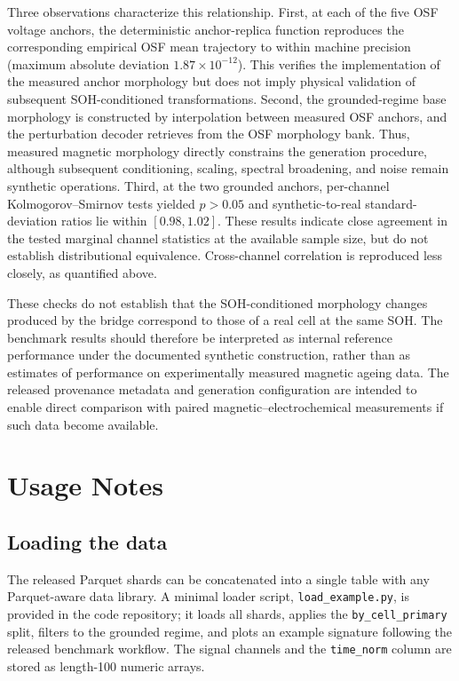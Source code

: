 \documentclass[11pt]{article}
\begin{document}
Three observations characterize this relationship. First, at each of the five OSF voltage anchors, the deterministic anchor-replica function reproduces the corresponding empirical OSF mean trajectory to within machine precision (maximum absolute deviation $1.87\times10^{-12}$). This verifies the implementation of the measured anchor morphology but does not imply
physical validation of subsequent SOH-conditioned transformations. Second, 
the grounded-regime base morphology is constructed by interpolation between
measured OSF anchors, and the perturbation decoder retrieves from the OSF
morphology bank. Thus, measured magnetic morphology directly constrains the
generation procedure, although subsequent conditioning, scaling, spectral
broadening, and noise remain synthetic operations. Third, at the two
grounded anchors, per-channel Kolmogorov--Smirnov tests yielded $p>0.05$
and synthetic-to-real standard-deviation ratios lie within $[0.98,1.02]$.
These results indicate close agreement in the tested marginal channel
statistics at the available sample size, but do not establish distributional
equivalence. Cross-channel correlation is reproduced less closely, as
quantified above.

These checks do not establish that the SOH-conditioned morphology changes
produced by the bridge correspond to those of a real cell at the same SOH.
The benchmark results should therefore be interpreted as internal reference
performance under the documented synthetic construction, rather than as
estimates of performance on experimentally measured magnetic ageing data.
The released provenance metadata and generation configuration are intended
to enable direct comparison with paired magnetic--electrochemical
measurements if such data become available.


\section*{Usage Notes}
\subsection*{Loading the data}

The released Parquet shards can be concatenated into a single table with any
Parquet-aware data library. A minimal loader script,
\texttt{load\_example.py}, is provided in the code repository; it loads all
shards, applies the \texttt{by\_cell\_primary} split, filters to the grounded
regime, and plots an example signature following the released benchmark
workflow. The signal channels and the \texttt{time\_norm} column are stored
as length-100 numeric arrays.
\end{document}

